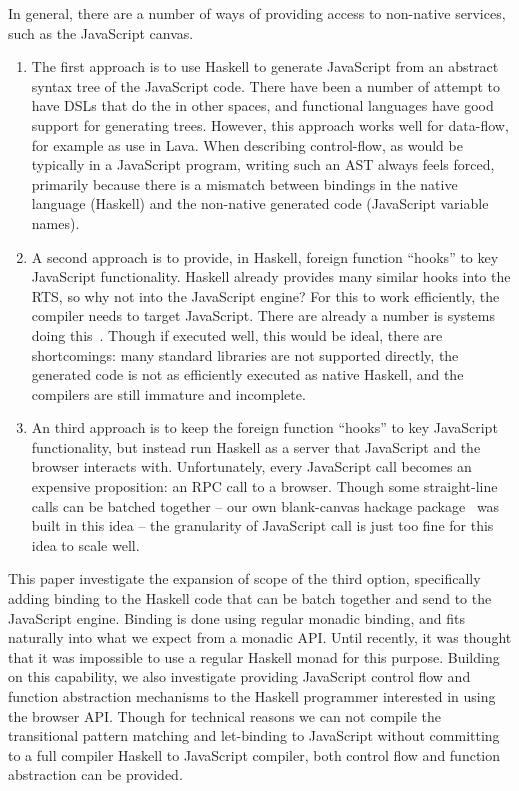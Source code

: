 In general, there are a number of ways of providing access to non-native services,
such as the JavaScript canvas.
\begin{enumerate}
\item The first approach is to use Haskell to generate JavaScript from
an abstract syntax tree of the JavaScript code. There have
been a number of attempt to have DSLs that do the in other spaces,
and functional languages have good support for generating trees.
However, this approach works well for data-flow, for example
as use in Lava. When describing control-flow,
as would be typically in a JavaScript program,  writing such an AST always
feels forced, primarily because there is a mismatch between
bindings in the native language (Haskell) and the non-native
generated code (JavaScript variable names).

\item A second approach is to provide, in Haskell, 
foreign function ``hooks'' to key JavaScript functionality.
Haskell already provides many similar hooks into the RTS,
so why not into the JavaScript engine?
For this to work efficiently, the compiler
needs to target JavaScript. There are already a
number is systems doing this~\cite{...}.
Though if executed well, this would be ideal,
there are shortcomings: many standard libraries
are not supported directly, the generated
code is not as efficiently executed as native Haskell,
and the compilers are still immature and incomplete.

\item An third approach is to keep the 
foreign function ``hooks'' to key JavaScript functionality,
but instead run Haskell as a server that JavaScript
and the browser interacts with.
Unfortunately, every JavaScript call becomes an expensive proposition: an RPC call
to a browser.
Though some straight-line calls can be batched together --
our own blank-canvas hackage package~\cite{..} was built in this idea --
the granularity of JavaScript call is just too fine for
this idea to scale well.
\end{enumerate}

This paper investigate the expansion of scope of the third option,
specifically adding binding to the Haskell code
that can be batch together and send to the JavaScript engine.
Binding is done using regular monadic binding, and fits naturally
into what we expect from a monadic API. Until recently,
it was thought that it was impossible to use a regular
Haskell monad for this purpose.
Building on this capability, we also investigate providing
JavaScript control flow and function abstraction mechanisms
to the Haskell programmer interested in using the browser API.
Though for technical reasons we can not compile the transitional
pattern matching and let-binding to JavaScript without committing
to a full compiler Haskell to JavaScript compiler, both
control flow and function abstraction can be provided.

